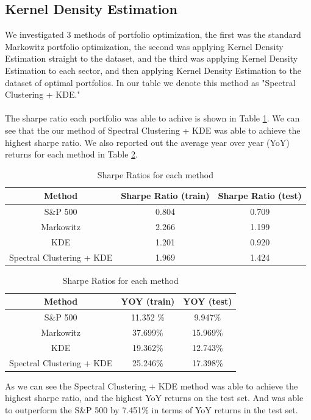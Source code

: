 \documentclass[10pt]{article}
\begin{document}
\subsection{Kernel Density Estimation}
We investigated 3 methods of portfolio optimization, the first was the standard Markowitz portfolio optimization, 
the second was applying Kernel Density Estimation straight to the dataset, and the third was applying Kernel Density
Estimation to each sector, and then applying Kernel Density Estimation to the dataset of optimal portfolios. In our 
table we denote this method as "Spectral Clustering + KDE."\\\\
The sharpe ratio each portfolio was able to achive is shown in Table \ref{tab:sharpe_ratios}. We can see that the
our method of Spectral Clustering + KDE was able to achieve the highest sharpe ratio. We also reported out the 
average year over year (YoY) returns for each method in Table \ref{tab:YoY_returns}.
\begin{table}[H]
    \centering
    \begin{tabular}{|c|c|c|}
        \hline
        Method & Sharpe Ratio (train) & Sharpe Ratio (test)\\
        \hline
        S\&P 500 & 0.804 & 0.709 \\
        Markowitz & 2.266 & 1.199 \\
        KDE & 1.201 & 0.920 \\
        Spectral Clustering + KDE & 1.969 & 1.424\\
        \hline
    \end{tabular}
    \caption{Sharpe Ratios for each method}
    \label{tab:sharpe_ratios}
\end{table}
\begin{table}[H]
    \centering
    \begin{tabular}{|c|c|c|}
        \hline
        Method & YOY (train) & YOY (test)\\
        \hline
        S\&P 500 & 11.352 \% & 9.947\% \\
        Markowitz & 37.699\% & 15.969\% \\
        KDE & 19.362\% & 12.743\% \\
        Spectral Clustering + KDE & 25.246\% & 17.398\%\\
        \hline
    \end{tabular}
    \caption{Sharpe Ratios for each method}
    \label{tab:YoY_returns}
\end{table}
As we can see the Spectral Clustering + KDE method was able to achieve the highest sharpe ratio,
and the highest YoY returns on the test set. And was able to outperform the S\&P 500 by 7.451\% in terms of YoY returns
in the test set.
\end{document}
